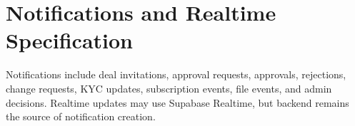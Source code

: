 \chapter{Notifications and Realtime Specification}
Notifications include deal invitations, approval requests, approvals, rejections, change requests, KYC updates, subscription events, file events, and admin decisions. Realtime updates may use Supabase Realtime, but backend remains the source of notification creation.
